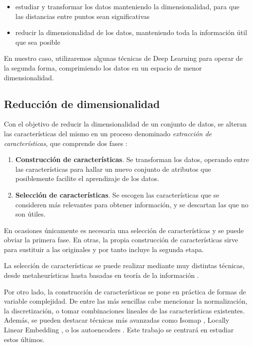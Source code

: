 \begin{itemize}
\tightlist
\item
  estudiar y transformar los datos manteniendo la dimensionalidad, para
  que las distancias entre puntos sean significativas
\item
  reducir la dimensionalidad de los datos, manteniendo toda la
  información útil que sea posible
\end{itemize}

En nuestro caso, utilizaremos algunas técnicas de Deep Learning para
operar de la segunda forma, comprimiendo los datos en un espacio de
menor dimensionalidad.

\subsection{Reducción de
dimensionalidad}\label{reducciuxf3n-de-dimensionalidad}

Con el objetivo de reducir la dimensionalidad de un conjunto de datos,
se alteran las características del mismo en un proceso denominado
\emph{extracción de características}, que comprende dos fases
\autocite{guyon2006}:

\begin{enumerate}
\def\labelenumi{\arabic{enumi}.}
\tightlist
\item
  \textbf{Construcción de características}. Se transforman los datos,
  operando entre las características para hallar un nuevo conjunto de
  atributos que posiblemente facilite el aprendizaje de los datos.
\item
  \textbf{Selección de características}. Se escogen las características
  que se consideren más relevantes para obtener información, y se
  descartan las que no son útiles.
\end{enumerate}

En ocasiones únicamente es necesaria una selección de características y
se puede obviar la primera fase. En otras, la propia construcción de
características sirve para sustituir a las originales y por tanto
incluye la segunda etapa.

La selección de características se puede realizar mediante muy distintas
técnicas, desde metaheurísticas hasta basadas en teoría de la
información \autocite{molina2002}.

Por otro lado, la construcción de características se pone en práctica de
formas de variable complejidad. De entre las más sencillas cabe
mencionar la normalización, la discretización, o tomar combinaciones
lineales de las características existentes. Además, se pueden destacar
técnicas más avanzadas como Isomap \autocite{tenenbaum2000}, Locally
Linear Embedding \autocite{roweis2000}, o los autoencoders
\autocite{hinton2006autoencoder}. Este trabajo se centrará en estudiar
estos últimos.

